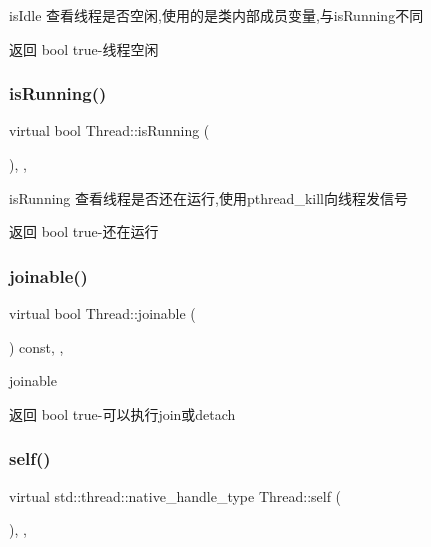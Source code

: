 is\+Idle 查看线程是否空闲,使用的是类内部成员变量,与is\+Running不同 

\begin{DoxyReturn}{返回}
bool true-\/线程空闲 
\end{DoxyReturn}
\mbox{\label{classThread_ab4c718f3ca4aa7514c7e89e38f9da894}} 
\subsubsection{\texorpdfstring{is\+Running()}{isRunning()}}
{\footnotesize\ttfamily virtual bool Thread\+::is\+Running (\begin{DoxyParamCaption}{ }\end{DoxyParamCaption})\hspace{0.3cm}{\ttfamily [inline]}, {\ttfamily [final]}, {\ttfamily [virtual]}}



is\+Running 查看线程是否还在运行,使用pthread\+\_\+kill向线程发信号 

\begin{DoxyReturn}{返回}
bool true-\/还在运行 
\end{DoxyReturn}
\mbox{\label{classThread_a86d1c278c0b9fea63037c437a909064f}} 
\subsubsection{\texorpdfstring{joinable()}{joinable()}}
{\footnotesize\ttfamily virtual bool Thread\+::joinable (\begin{DoxyParamCaption}{ }\end{DoxyParamCaption}) const\hspace{0.3cm}{\ttfamily [inline]}, {\ttfamily [final]}, {\ttfamily [virtual]}}



joinable 

\begin{DoxyReturn}{返回}
bool true-\/可以执行join或detach 
\end{DoxyReturn}
\mbox{\label{classThread_a554185abbfacbcc4bf2e953cdddcbbba}} 
\subsubsection{\texorpdfstring{self()}{self()}}
{\footnotesize\ttfamily virtual std\+::thread\+::native\+\_\+handle\+\_\+type Thread\+::self (\begin{DoxyParamCaption}{ }\end{DoxyParamCaption})\hspace{0.3cm}{\ttfamily [inline]}, {\ttfamily [final]}, {\ttfamily [virtual]}}



